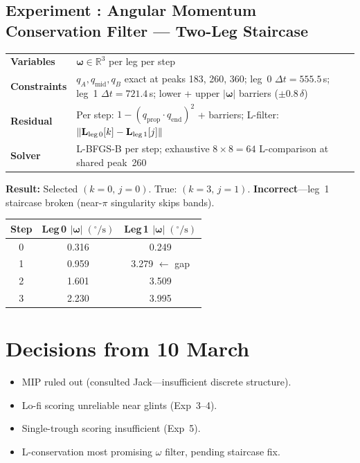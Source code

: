 \documentclass[11pt,a4paper]{article}
\makeatletter
\newcounter{expnum}
\newenvironment{experiment}[1]{%
  \refstepcounter{expnum}%
  \subsection*{Experiment \theexpnum: #1}%
  \vspace{-0.5em}%
}{\vspace{1em}}
\newcommand{\setup}[4]{%
  \noindent
  \begin{tabular}{@{}p{2.8cm}p{11cm}@{}}
    \toprule
    \textbf{Variables}    & #1 \\
    \textbf{Constraints}  & #2 \\
    \textbf{Residual}     & #3 \\
    \textbf{Solver}       & #4 \\
    \bottomrule
  \end{tabular}
  \vspace{0.8em}
}
\makeatother
\begin{document}
\begin{experiment}{Angular Momentum Conservation Filter --- Two-Leg Staircase}

\setup
  {$\boldsymbol{\omega} \in \mathbb{R}^3$ per leg per step}
  {$q_A, q_\text{mid}, q_B$ exact at peaks 183, 260, 360; leg~0 $\Delta t = 555.5\,$s; leg~1 $\Delta t = 721.4\,$s; lower + upper $|\boldsymbol{\omega}|$ barriers ($\pm 0.8\,\delta$)}
  {Per step: $1 - (q_\text{prop} \cdot q_\text{end})^2$ + barriers;\; L-filter: $\|\mathbf{L}_{\text{leg\,0}}[k] - \mathbf{L}_{\text{leg\,1}}[j]\|$}
  {L-BFGS-B per step; exhaustive $8 \times 8 = 64$ L-comparison at shared peak~260}

\textbf{Result:} Selected $(k{=}0,\, j{=}0)$. True: $(k{=}3,\, j{=}1)$. \textbf{Incorrect}---leg~1 staircase broken (near-$\pi$ singularity skips bands).

\begin{center}
\begin{tabular}{ccc}
  \toprule
  Step & Leg\,0 $|\boldsymbol{\omega}|\;(^\circ/\text{s})$ & Leg\,1 $|\boldsymbol{\omega}|\;(^\circ/\text{s})$ \\
  \midrule
  0 & 0.316 & 0.249 \\
  1 & 0.959 & 3.279 $\leftarrow$ gap \\
  2 & 1.601 & 3.509 \\
  3 & 2.230 & 3.995 \\
  \bottomrule
\end{tabular}
\end{center}

\end{experiment}

\section{Decisions from 10 March}

\begin{itemize}[nosep]
  \item MIP ruled out (consulted Jack---insufficient discrete structure).
  \item Lo-fi scoring unreliable near glints (Exp~3--4).
  \item Single-trough scoring insufficient (Exp~5).
  \item L-conservation most promising $\omega$ filter, pending staircase fix.
\end{itemize}

\clearpage
\end{document}
